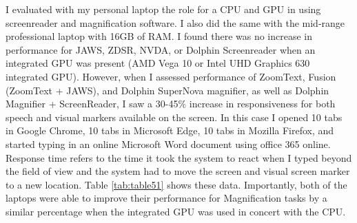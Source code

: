 I evaluated with my personal laptop the role for a CPU and GPU in using screenreader and magnification software. I also did the same with the mid-range professional laptop with 16GB of RAM. I found there was no increase in performance for JAWS, ZDSR, NVDA, or Dolphin Screenreader when an integrated GPU was present (AMD Vega 10 or Intel UHD Graphics 630 integrated GPU). However, when I assessed performance of ZoomText, Fusion (ZoomText + JAWS), and Dolphin SuperNova magnifier, as well as Dolphin Magnifier + ScreenReader, I saw a 30-45\% increase in responsiveness for both speech and visual markers available on the screen. In this case I opened 10 tabs in Google Chrome, 10 tabs in Microsoft Edge, 10 tabs in Mozilla Firefox, and started typing in an online Microsoft Word document using office 365 online. Response time refers to the time it took the system to react when I typed beyond the field of view and the system had to move the screen and visual screen marker to a new location. Table \ref{tab:table51} shows these data. Importantly, both of the laptops were able to improve their performance for Magnification tasks by a similar percentage when the integrated GPU was used in concert with the CPU.

